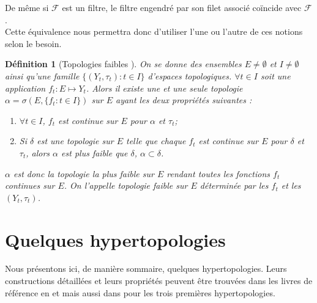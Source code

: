 \documentclass[11pt]{report}
\newenvironment{boxdefinition}
{\begin{tcolorbox}
		[enhanced jigsaw,breakable,pad at break*=1mm,
		colback=black!5!white,boxrule=0pt,frame hidden,
		borderline west={1.5mm}{-2mm}{blue}]}
	{\end{tcolorbox}}
\theoremstyle{styletheorem}
\theoremstyle{styledef}
\newtheorem{definitions}[theoreme]{Définition}
\theoremstyle{remark}
\newenvironment{definition}{\vspace*{0.3cm}\begin{boxdefinition}\begin{definitions}}{\end{definitions}\end{boxdefinition}\vspace*{0.3cm}}
\newcommand{\Fr}{\ensuremath{\mathcal{F}}  }
\begin{document}
De même si $\Fr$ est un filtre, le filtre engendré par son filet associé coïncide avec \Fr.\\
Cette équivalence nous permettra donc d'utiliser l'une ou l'autre de ces notions selon le besoin.\\
\begin{definition}[Topologies faibles \cite{b11}]\label{topfaible}
	On se donne des ensembles $E \neq \emptyset$ et $I \neq \emptyset$ ainsi qu'une famille	$\lbrace (Y_t, \tau_t) \colon t \in I \rbrace$ d'espaces topologiques. $\forall t \in I$ soit une application $f_t \colon E \longmapsto Y_t$. Alors il existe une et une seule topologie $\alpha = \sigma(E, \lbrace f_t \colon t \in I \rbrace)$ sur $E$ ayant les deux propriétés suivantes :
	\begin{enumerate}[label = $\bullet$]
		\item $\forall t \in I$, $f_t$ est continue sur $E$ pour $\alpha$ et $\tau_t$;
		\item Si $\delta$ est une topologie sur $E$ telle que chaque $f_t$ est continue sur $E$ pour $\delta$ et $\tau_t$, alors $\alpha$ est plus faible que $\delta$, $\alpha \subset \delta$.
	\end{enumerate}
	$\alpha$ est donc la topologie la plus faible sur $E$ rendant toutes les fonctions $f_t$ continues sur $E$. On l'appelle topologie faible sur $E$ déterminée par les $f_t$ et les $(Y_t, \tau_t)$.
\end{definition}
\section{Quelques hypertopologies}
Nous présentons ici, de manière sommaire, quelques hypertopologies. Leurs constructions détaillées et leurs propriétés peuvent être trouvées dans les livres de référence en  \cite{b5} et \cite{b8} mais aussi dans \cite{b7} pour les trois premières hypertopologies. 
\end{document}
